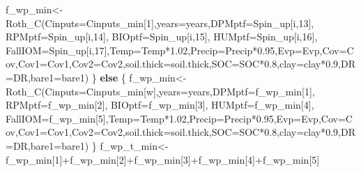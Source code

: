 \documentclass[
  10pt,
  b5paper,
]{book}
\newenvironment{Shaded}{\begin{snugshade}}{\end{snugshade}}
\newcommand{\AttributeTok}[1]{\textcolor[rgb]{0.77,0.63,0.00}{#1}}
\newcommand{\ControlFlowTok}[1]{\textcolor[rgb]{0.13,0.29,0.53}{\textbf{#1}}}
\newcommand{\DecValTok}[1]{\textcolor[rgb]{0.00,0.00,0.81}{#1}}
\newcommand{\FloatTok}[1]{\textcolor[rgb]{0.00,0.00,0.81}{#1}}
\newcommand{\FunctionTok}[1]{\textcolor[rgb]{0.00,0.00,0.00}{#1}}
\newcommand{\NormalTok}[1]{#1}
\newcommand{\OtherTok}[1]{\textcolor[rgb]{0.56,0.35,0.01}{#1}}
\newcommand{\SpecialCharTok}[1]{\textcolor[rgb]{0.00,0.00,0.00}{#1}}
\begin{document}
\begin{Shaded}
\begin{Highlighting}[]
\NormalTok{f\_wp\_min}\OtherTok{\textless{}{-}}\FunctionTok{Roth\_C}\NormalTok{(}\AttributeTok{Cinputs=}\NormalTok{Cinputs\_min[}\DecValTok{1}\NormalTok{],}\AttributeTok{years=}\NormalTok{years,}\AttributeTok{DPMptf=}\NormalTok{Spin\_up[i,}\DecValTok{13}\NormalTok{], }\AttributeTok{RPMptf=}\NormalTok{Spin\_up[i,}\DecValTok{14}\NormalTok{], }\AttributeTok{BIOptf=}\NormalTok{Spin\_up[i,}\DecValTok{15}\NormalTok{], }\AttributeTok{HUMptf=}\NormalTok{Spin\_up[i,}\DecValTok{16}\NormalTok{], }\AttributeTok{FallIOM=}\NormalTok{Spin\_up[i,}\DecValTok{17}\NormalTok{],}\AttributeTok{Temp=}\NormalTok{Temp}\SpecialCharTok{*}\FloatTok{1.02}\NormalTok{,}\AttributeTok{Precip=}\NormalTok{Precip}\SpecialCharTok{*}\FloatTok{0.95}\NormalTok{,}\AttributeTok{Evp=}\NormalTok{Evp,}\AttributeTok{Cov=}\NormalTok{Cov,}\AttributeTok{Cov1=}\NormalTok{Cov1,}\AttributeTok{Cov2=}\NormalTok{Cov2,}\AttributeTok{soil.thick=}\NormalTok{soil.thick,}\AttributeTok{SOC=}\NormalTok{SOC}\SpecialCharTok{*}\FloatTok{0.8}\NormalTok{,}\AttributeTok{clay=}\NormalTok{clay}\SpecialCharTok{*}\FloatTok{0.9}\NormalTok{,}\AttributeTok{DR=}\NormalTok{DR,}\AttributeTok{bare1=}\NormalTok{bare1)}
\NormalTok{\} }\ControlFlowTok{else}\NormalTok{ \{}
\NormalTok{f\_wp\_min}\OtherTok{\textless{}{-}}\FunctionTok{Roth\_C}\NormalTok{(}\AttributeTok{Cinputs=}\NormalTok{Cinputs\_min[w],}\AttributeTok{years=}\NormalTok{years,}\AttributeTok{DPMptf=}\NormalTok{f\_wp\_min[}\DecValTok{1}\NormalTok{], }\AttributeTok{RPMptf=}\NormalTok{f\_wp\_min[}\DecValTok{2}\NormalTok{], }\AttributeTok{BIOptf=}\NormalTok{f\_wp\_min[}\DecValTok{3}\NormalTok{], }\AttributeTok{HUMptf=}\NormalTok{f\_wp\_min[}\DecValTok{4}\NormalTok{], }\AttributeTok{FallIOM=}\NormalTok{f\_wp\_min[}\DecValTok{5}\NormalTok{],}\AttributeTok{Temp=}\NormalTok{Temp}\SpecialCharTok{*}\FloatTok{1.02}\NormalTok{,}\AttributeTok{Precip=}\NormalTok{Precip}\SpecialCharTok{*}\FloatTok{0.95}\NormalTok{,}\AttributeTok{Evp=}\NormalTok{Evp,}\AttributeTok{Cov=}\NormalTok{Cov,}\AttributeTok{Cov1=}\NormalTok{Cov1,}\AttributeTok{Cov2=}\NormalTok{Cov2,}\AttributeTok{soil.thick=}\NormalTok{soil.thick,}\AttributeTok{SOC=}\NormalTok{SOC}\SpecialCharTok{*}\FloatTok{0.8}\NormalTok{,}\AttributeTok{clay=}\NormalTok{clay}\SpecialCharTok{*}\FloatTok{0.9}\NormalTok{,}\AttributeTok{DR=}\NormalTok{DR,}\AttributeTok{bare1=}\NormalTok{bare1)}
\NormalTok{\}}
\NormalTok{f\_wp\_t\_min}\OtherTok{\textless{}{-}}\NormalTok{f\_wp\_min[}\DecValTok{1}\NormalTok{]}\SpecialCharTok{+}\NormalTok{f\_wp\_min[}\DecValTok{2}\NormalTok{]}\SpecialCharTok{+}\NormalTok{f\_wp\_min[}\DecValTok{3}\NormalTok{]}\SpecialCharTok{+}\NormalTok{f\_wp\_min[}\DecValTok{4}\NormalTok{]}\SpecialCharTok{+}\NormalTok{f\_wp\_min[}\DecValTok{5}\NormalTok{]}

\end{Highlighting}
\end{Shaded}
\end{document}

